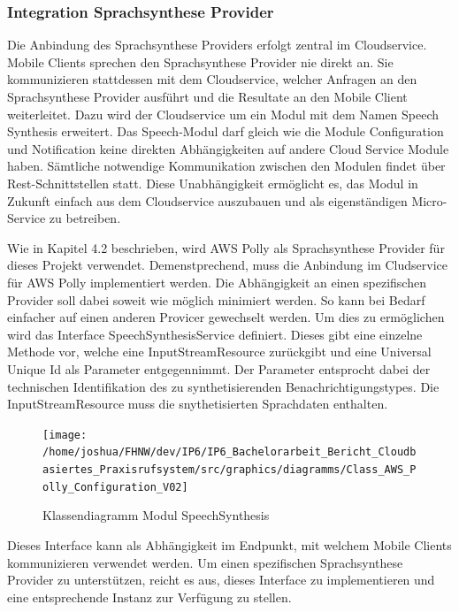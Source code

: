 \clearpage
\subsubsection{Integration Sprachsynthese Provider}

Die Anbindung des Sprachsynthese Providers erfolgt zentral im Cloudservice.
Mobile Clients sprechen den Sprachsynthese Provider nie direkt an.
Sie kommunizieren stattdessen mit dem Cloudservice, welcher Anfragen an den Sprachsynthese Provider ausführt und die Resultate an den Mobile Client weiterleitet.
Dazu wird der Cloudservice um ein Modul mit dem Namen Speech Synthesis erweitert.
Das Speech-Modul darf gleich wie die Module Configuration und Notification keine direkten Abhängigkeiten auf andere Cloud Service Module haben.
Sämtliche notwendige Kommunikation zwischen den Modulen findet über Rest-Schnittstellen statt.
Diese Unabhängigkeit ermöglicht es, das Modul in Zukunft einfach aus dem Cloudservice auszubauen und als eigenständigen Micro-Service zu betreiben.

Wie in Kapitel 4.2 beschrieben, wird AWS Polly als Sprachsynthese Provider für dieses Projekt verwendet.
Demenstprechend, muss die Anbindung im Cludservice für AWS Polly implementiert werden.
Die Abhängigkeit an einen spezifischen Provider soll dabei soweit wie möglich minimiert werden.
So kann bei Bedarf einfacher auf einen anderen Provicer gewechselt werden.
Um dies zu ermöglichen wird das Interface SpeechSynthesisService definiert.
Dieses gibt eine einzelne Methode vor, welche eine InputStreamResource zurückgibt und eine Universal Unique Id als Parameter entgegennimmt.
Der Parameter entsprocht dabei der technischen Identifikation des zu synthetisierenden Benachrichtigungstypes.
Die InputStreamResource muss die snythetisierten Sprachdaten enthalten.

\begin{figure}[h]
    \centering
    \begin{minipage}[b]{1\textwidth}
        \texttt{[image: /home/joshua/FHNW/dev/IP6/IP6\_Bachelorarbeit\_Bericht\_Cloudbasiertes\_Praxisrufsystem/src/graphics/diagramms/Class\_AWS\_Polly\_Configuration\_V02]}
        \caption{Klassendiagramm Modul SpeechSynthesis}
    \end{minipage}
\end{figure}

Dieses Interface kann als Abhängigkeit im Endpunkt, mit welchem Mobile Clients kommunizieren verwendet werden.
Um einen spezifischen Sprachsynthese Provider zu unterstützen, reicht es aus, dieses Interface zu implementieren und eine entsprechende Instanz zur Verfügung zu stellen.

